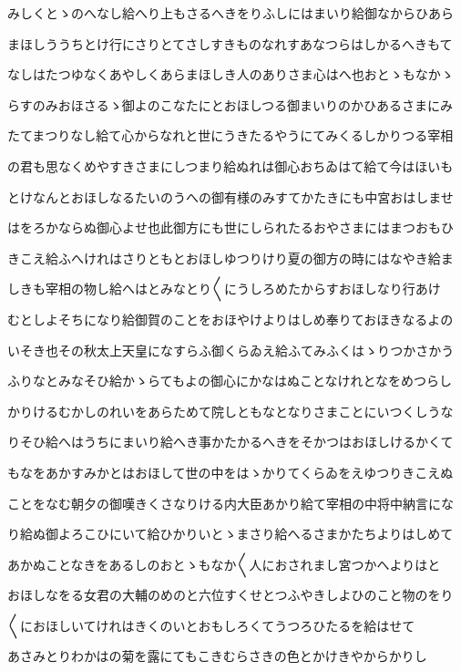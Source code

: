 \documentclass[a4paper,11pt,landscape]{ltjtarticle}
\begin{document}
みしくとゝのへなし給へり上もさるへきをりふしにはまいり給御なからひあら
\par\medskip
まほしううちとけ行にさりとてさしすきものなれすあなつらはしかるへきもて
\par\medskip
なしはたつゆなくあやしくあらまほしき人のありさま心はへ也おとゝもなかゝ
\par\medskip
らすのみおほさるゝ御よのこなたにとおほしつる御まいりのかひあるさまにみ
\par\medskip
たてまつりなし給て心からなれと世にうきたるやうにてみくるしかりつる宰相
\par\medskip
の君も思なくめやすきさまにしつまり給ぬれは御心おちゐはて給て今はほいも
\par\medskip
とけなんとおほしなるたいのうへの御有様のみすてかたきにも中宮おはしませ
\par\medskip
はをろかならぬ御心よせ也此御方にも世にしられたるおやさまにはまつおもひ
\par\medskip
きこえ給ふへけれはさりともとおほしゆつりけり夏の御方の時にはなやき給ま
\par\medskip
しきも宰相の物し給へはとみなとり〱にうしろめたからすおほしなり行あけ
\par\medskip
むとしよそちになり給御賀のことをおほやけよりはしめ奉りておほきなるよの
\par\medskip
いそき也その秋太上天皇になすらふ御くらゐえ給ふてみふくはゝりつかさかう
\par\medskip
ふりなとみなそひ給かゝらてもよの御心にかなはぬことなけれとなをめつらし
\par\medskip
かりけるむかしのれいをあらためて院しともなとなりさまことにいつくしうな
\par\medskip
りそひ給へはうちにまいり給へき事かたかるへきをそかつはおほしけるかくて
\par\medskip
もなをあかすみかとはおほして世の中をはゝかりてくらゐをえゆつりきこえぬ
\par\medskip
ことをなむ朝夕の御嘆きくさなりける内大臣あかり給て宰相の中将中納言にな
\par\medskip
り給ぬ御よろこひにいて給ひかりいとゝまさり給へるさまかたちよりはしめて
\par\medskip
あかぬことなきをあるしのおとゝもなか〱人におされまし宮つかへよりはと
\par\medskip
おほしなをる女君の大輔のめのと六位すくせとつふやきしよひのこと物のをり
\par\medskip
〱におほしいてけれはきくのいとおもしろくてうつろひたるを給はせて
\par\medskip
あさみとりわかはの菊を露にてもこきむらさきの色とかけきやからかりし
\end{document}
